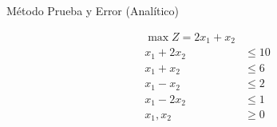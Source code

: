 \begin{frameExample}{Método Prueba y Error (Analítico)  \label{example:2-9-3_Gupta-ebook}}{}

    \begin{align*}
    \max Z = 2x_1 + x_2 & \\[5mm]
    x_1 + 2x_2 & \leq 10\\
    x_1 + x_2 & \leq 6\\
    x_1 - x_2 & \leq 2\\
    x_1 - 2x_2 & \leq 1\\[5mm]
    x_1, x_2 & \geq 0
  \end{align*}
\end{frameExample}

